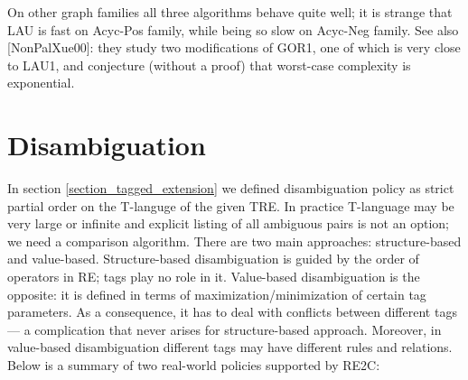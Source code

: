\documentclass{article}
\theoremstyle{definition}
\begin{document}
\begin{multicols}{2}
On other graph families all three algorithms behave quite well;
it is strange that LAU is fast on Acyc-Pos family, while being so slow on Acyc-Neg family.
See also [NonPalXue00]: they study two modifications of GOR1, one of which is very close to LAU1,
and conjecture (without a proof) that worst-case complexity is exponential.


\section{Disambiguation}\label{section_disambiguation}

In section \ref{section_tagged_extension} we defined disambiguation policy as strict partial order on the T-languge of the given TRE.
In practice T-language may be very large or infinite
and explicit listing of all ambiguous pairs is not an option; we need a comparison algorithm.
There are two main approaches: structure-based and value-based.
Structure-based disambiguation is guided by the order of operators in RE; tags play no role in it.
Value-based disambiguation is the opposite: it is defined in terms of maximization/minimization of certain tag parameters.
As a consequence, it has to deal with conflicts between different tags ---
a complication that never arises for structure-based approach.
Moreover, in value-based disambiguation different tags may have different rules and relations.
Below is a summary of two real-world policies supported by RE2C:
\\


\end{multicols}
\end{document}
